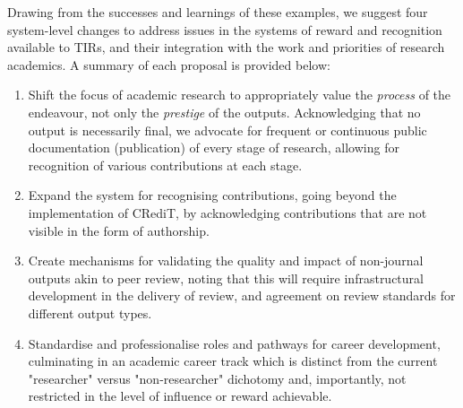 \documentclass[authordate,meta,issue]{jote-new-article}
\begin{document}
Drawing from the successes and learnings of these examples, we suggest four system-level changes to address issues in the systems of reward and recognition available to TIRs, and their integration with the work and priorities of research academics. A summary of each proposal is provided below:






\begin{enumerate}

  \item Shift the focus of academic research to appropriately value the \emph{process} of the endeavour, not only the \emph{prestige} of the outputs. Acknowledging that no output is necessarily final, we advocate for frequent or continuous public documentation (publication) of every stage of research, allowing for recognition of various contributions at each stage.







  \item Expand the system for recognising contributions, going beyond the implementation of CRediT, by acknowledging contributions that are not visible in the form of authorship.







  \item Create mechanisms for validating the quality and impact of non-journal outputs akin to peer review, noting that this will require infrastructural development in the delivery of review, and agreement on review standards for different output types.







  \item Standardise and professionalise roles and pathways for career development, culminating in an academic career track which is distinct from the current "researcher" versus "non-researcher" dichotomy and, importantly, not restricted in the level of influence or reward achievable.

\end{enumerate}
\end{document}
